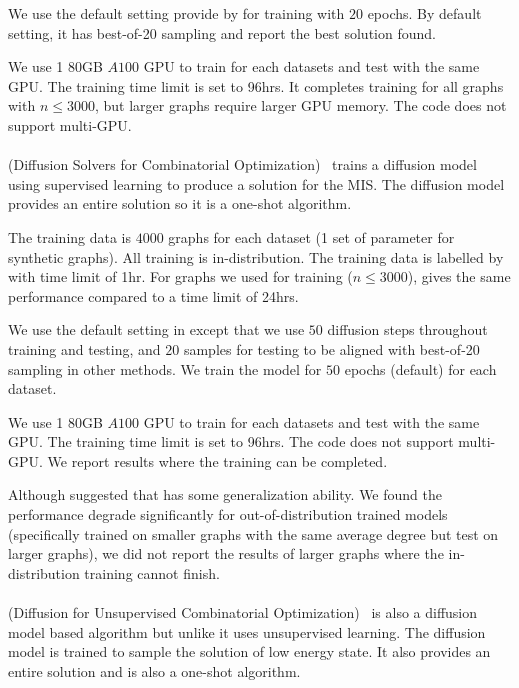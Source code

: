 We use the default setting provide by \cite{zhang2023let} for training with $20$ epochs. By default setting, it has best-of-20 sampling and report the best solution found.

We use 1 80GB $A100$ GPU to train for each datasets and test with the same GPU. The training time limit is set to 96hrs. It completes training for all graphs with $n\leq 3000$, but larger graphs require larger GPU memory. The code does not support multi-GPU.

\paragraph{\difusco}
\difusco(Diffusion Solvers
 for Combinatorial Optimization)~\citep{sun2023difusco} trains a diffusion model using supervised learning to produce a solution for the MIS. The diffusion model provides an entire solution so it is a one-shot algorithm.

The training data is $4000$ graphs for each dataset (1 set of parameter for synthetic graphs). All training is in-distribution. The training data is labelled by \redumis with time limit of 1hr. For graphs we used for training ($n\leq 3000$), \redumis gives the same performance compared to a time limit of 24hrs. 

We use the default setting in \citep{sun2023difusco} except that we use $50$ diffusion steps throughout training and testing, and $20$ samples for testing to be aligned with best-of-20 sampling in other methods. We train the model for $50$ epochs (default) for each dataset.

We use 1 80GB $A100$ GPU to train for each datasets and test with the same GPU. The training time limit is set to 96hrs. The code does not support multi-GPU. We report results where the training can be completed.

Although \citet{sun2023difusco} suggested that \difusco has some generalization ability. We found the performance degrade significantly for out-of-distribution trained models (specifically trained on smaller graphs with the same average degree but test on larger graphs), we did not report the results of larger graphs where the in-distribution training cannot finish.

\paragraph{\diffuco}
\diffuco(Diffusion for Unsupervised Combinatorial Optimization)~\citep{sanokowskidiffusion} is also a diffusion model based algorithm but unlike \difusco it uses unsupervised learning. The diffusion model is trained to sample the solution of low energy state. It also provides an entire solution and is also a one-shot algorithm.

